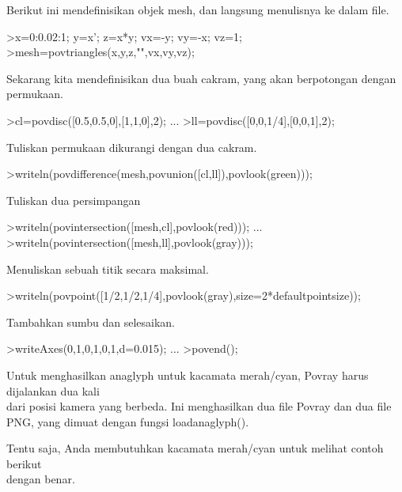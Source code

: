 \documentclass[a4paper,10pt]{article}
\begin{document}
\begin{eulernotebook}
\begin{eulercomment}
\begin{eulercomment}
\begin{eulercomment}
\begin{eulercomment}
\begin{eulercomment}
\begin{eulercomment}
\begin{eulercomment}
\begin{eulercomment}
\begin{eulercomment}
\begin{eulercomment}
\begin{eulercomment}
Berikut ini mendefinisikan objek mesh, dan langsung menulisnya ke
dalam file.
\end{eulercomment}
\begin{eulerprompt}
>x=0:0.02:1; y=x'; z=x*y; vx=-y; vy=-x; vz=1;
>mesh=povtriangles(x,y,z,"",vx,vy,vz);
\end{eulerprompt}
\begin{eulercomment}
Sekarang kita mendefinisikan dua buah cakram, yang akan berpotongan
dengan permukaan.
\end{eulercomment}
\begin{eulerprompt}
>cl=povdisc([0.5,0.5,0],[1,1,0],2); ...
>ll=povdisc([0,0,1/4],[0,0,1],2);
\end{eulerprompt}
\begin{eulercomment}
Tuliskan permukaan dikurangi dengan dua cakram.
\end{eulercomment}
\begin{eulerprompt}
>writeln(povdifference(mesh,povunion([cl,ll]),povlook(green)));
\end{eulerprompt}
\begin{eulercomment}
Tuliskan dua persimpangan
\end{eulercomment}
\begin{eulerprompt}
>writeln(povintersection([mesh,cl],povlook(red))); ...
>writeln(povintersection([mesh,ll],povlook(gray)));
\end{eulerprompt}
\begin{eulercomment}
Menuliskan sebuah titik secara maksimal.
\end{eulercomment}
\begin{eulerprompt}
>writeln(povpoint([1/2,1/2,1/4],povlook(gray),size=2*defaultpointsize));
\end{eulerprompt}
\begin{eulercomment}
Tambahkan sumbu dan selesaikan.
\end{eulercomment}
\begin{eulerprompt}
>writeAxes(0,1,0,1,0,1,d=0.015); ...
>povend();
\end{eulerprompt}
\begin{eulercomment}
Untuk menghasilkan anaglyph untuk kacamata merah/cyan, Povray harus
dijalankan dua kali\\
dari posisi kamera yang berbeda. Ini menghasilkan dua file Povray dan
dua file PNG, yang dimuat dengan fungsi loadanaglyph().

Tentu saja, Anda membutuhkan kacamata merah/cyan untuk melihat contoh
berikut\\
dengan benar.


\end{eulercomment}
\end{eulercomment}
\end{eulercomment}
\end{eulercomment}
\end{eulercomment}
\end{eulercomment}
\end{eulercomment}
\end{eulercomment}
\end{eulercomment}
\end{eulercomment}
\end{eulercomment}
\end{eulernotebook}
\end{document}
